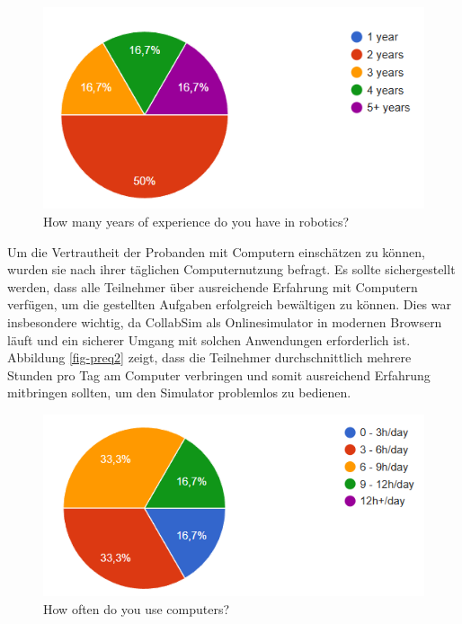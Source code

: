 \documentclass[german,version-2020-11]{uzl-thesis}
\begin{document}
  \begin{figure}[htpb]
    \centering
    \includegraphics{figures/pre-question1.png}
    \caption{How many years of experience do you have in robotics? }
    \label{fig-preq1}
  \end{figure}


  Um die Vertrautheit der Probanden mit Computern einschätzen zu können, wurden sie nach ihrer täglichen Computernutzung befragt. 
  Es sollte sichergestellt werden, dass alle Teilnehmer über ausreichende Erfahrung mit Computern verfügen, um die gestellten Aufgaben erfolgreich bewältigen zu können. 
  Dies war insbesondere wichtig, da CollabSim als Onlinesimulator in modernen Browsern läuft und ein sicherer Umgang mit solchen Anwendungen erforderlich ist.
  Abbildung \vref{fig-preq2} zeigt, dass die Teilnehmer durchschnittlich mehrere Stunden pro Tag am Computer verbringen und somit ausreichend Erfahrung mitbringen sollten, 
  um den Simulator problemlos zu bedienen.
  
  \begin{figure}[htpb]
    \centering
    \includegraphics{figures/pre_question2.png}
    \caption{How often do you use computers? }
    \label{fig-preq2}
  \end{figure}
\end{document}
